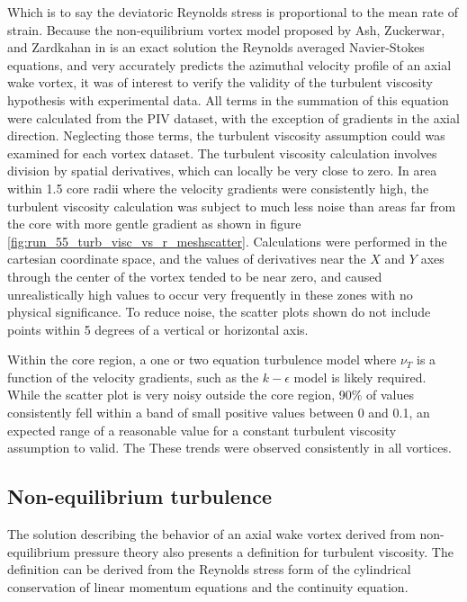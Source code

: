 \noindent
Which is to say the deviatoric Reynolds stress is proportional to the mean rate 
of strain. Because the non-equilibrium vortex model proposed by Ash, Zuckerwar, 
and Zardkahan in \cite{ash2011} is an exact solution the Reynolds averaged 
Navier-Stokes equations, and very accurately predicts the azimuthal velocity 
profile of an axial wake vortex, it was of interest to verify the validity of 
the turbulent viscosity hypothesis with experimental data. All terms in the 
summation of this equation were calculated from the PIV dataset, with the 
exception of gradients in the axial direction. Neglecting those terms, the 
turbulent viscosity assumption could was examined for each vortex dataset. The 
turbulent viscosity calculation involves division by spatial derivatives, which 
can locally be very close to zero. In area within 1.5 core radii where the 
velocity gradients were consistently high, the turbulent viscosity calculation 
was subject to much less noise than areas far from the core with more gentle 
gradient as shown in figure \ref{fig:run_55_turb_visc_vs_r_meshscatter}. 
Calculations were performed in the cartesian coordinate space, and the values 
of derivatives near the $X$ and $Y$ axes through the center of the vortex 
tended to be near zero, and caused unrealistically high values to occur very 
frequently in these zones with no physical significance. To reduce noise, the 
scatter plots shown do not include points within 5 degrees of a vertical or 
horizontal axis.



\noindent
Within the core region, a one or two equation turbulence model where $\nu_T$ is 
a function of the velocity gradients, such as the $k-\epsilon$ model is likely 
required. While the scatter plot is very noisy outside the core region, 
90\% of values consistently fell within a band of small positive values between 
0 and 0.1, an expected range of a reasonable value for a constant turbulent 
viscosity assumption to valid. The These trends were observed consistently in 
all vortices.

\subsection{Non-equilibrium turbulence}
The solution describing the behavior of an axial wake vortex derived from 
non-equilibrium pressure theory also presents a definition for turbulent 
viscosity. The definition can be derived from the Reynolds stress form of the 
cylindrical conservation of linear momentum equations and the continuity 
equation.

